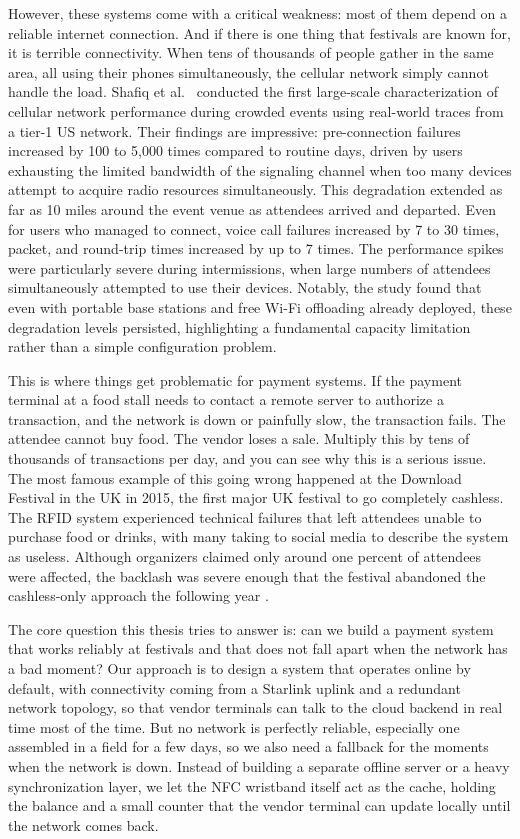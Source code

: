 However, these systems come with a critical weakness: most of them depend on a reliable internet connection. And if there is one thing that festivals are known for, it is terrible connectivity. When tens of thousands of people gather in the same area, all using their phones simultaneously, the cellular network simply cannot handle the load. Shafiq et al.~\cite{Shafiq2013} conducted the first large-scale characterization of cellular network performance during crowded events using real-world traces from a tier-1 US network. Their findings are impressive: pre-connection failures increased by 100 to 5,000 times compared to routine days, driven by users exhausting the limited bandwidth of the signaling channel when too many devices attempt to acquire radio resources simultaneously. This degradation extended as far as 10 miles around the event venue as attendees arrived and departed. Even for users who managed to connect, voice call failures increased by 7 to 30 times, packet, and round-trip times increased by up to 7 times. The performance spikes were particularly severe during intermissions, when large numbers of attendees simultaneously attempted to use their devices. Notably, the study found that even with portable base stations and free Wi-Fi offloading already deployed, these degradation levels persisted, highlighting a fundamental capacity limitation rather than a simple configuration problem.


This is where things get problematic for payment systems. If the payment terminal at a food stall needs to contact a remote server to authorize a transaction, and the network is down or painfully slow, the transaction fails. The attendee cannot buy food. The vendor loses a sale. Multiply this by tens of thousands of transactions per day, and you can see why this is a serious issue. The most famous example of this going wrong happened at the Download Festival in the UK in 2015, the first major UK festival to go completely cashless. The RFID system experienced technical failures that left attendees unable to purchase food or drinks, with many taking to social media to describe the system as useless. Although organizers claimed only around one percent of attendees were affected, the backlash was severe enough that the festival abandoned the cashless-only approach the following year \cite{eFestivals2016}.

The core question this thesis tries to answer is: can we build a payment system that works reliably at festivals and that does not fall apart when the network has a bad moment? Our approach is to design a system that operates online by default, with connectivity coming from a Starlink uplink and a redundant network topology, so that vendor terminals can talk to the cloud backend in real time most of the time. But no network is perfectly reliable, especially one assembled in a field for a few days, so we also need a fallback for the moments when the network is down. Instead of building a separate offline server or a heavy synchronization layer, we let the NFC wristband itself act as the cache, holding the balance and a small counter that the vendor terminal can update locally until the network comes back.

